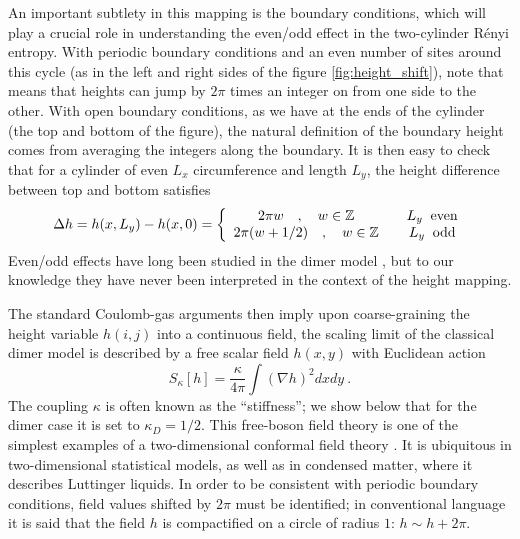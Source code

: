 \documentclass[11pt]{iopart}
\begin{document}
An important subtlety in this mapping is the boundary conditions, which will play a crucial role in understanding the even/odd effect in the two-cylinder R\'enyi entropy.
With periodic boundary conditions and an even number of sites around this cycle (as in the left and right sides of the figure \ref{fig:height_shift}), note that means that heights can jump by $2\pi$ times an integer on from one side to the other. 
With open boundary conditions, as we have at the ends of the cylinder (the top and bottom of the figure), the natural definition of the boundary height comes from averaging the integers along the boundary. 
It is then easy to check that for a cylinder of even $L_x$ circumference and length $L_y$,  the height difference between top and bottom satisfies
\begin{equation}
 \Delta h=h(x,L_y)-h(x,0)=\left\{
 \begin{array}{ccc}
  2\pi w \quad,\quad w\in \mathbb{Z}&&L_y \;\;{\rm even}\\
  2\pi (w+1/2) \quad,\quad w\in \mathbb{Z}&&L_y \;\;{\rm odd}
 \end{array}
 \right.
\end{equation}
Even/odd effects have long been studied in the dimer model \cite{Ferdinand,Dimers_all,Ruelledimers}, but to our knowledge they have never been interpreted in the context of the height mapping. 
 
The standard Coulomb-gas arguments \cite{Nienhuis} then imply upon coarse-graining the height variable $h(i,j)$ into a continuous field, the scaling limit of the classical dimer model is described by a free scalar field $h(x,y)$ with Euclidean action
 \begin{equation}\label{eq:free_field_bis}
  S_\kappa[h]=\frac{\kappa}{4\pi}\int \left(\nabla h\right)^2 dx dy\ .
 \end{equation}
The coupling $\kappa$ is often known as the ``stiffness''; we show below that for the dimer case it is set to $\kappa_D=1/2$. This free-boson field theory is one of the simplest examples of a two-dimensional conformal field theory \cite{Ginsparg}. It is ubiquitous in two-dimensional statistical models, as well as in condensed matter, where it describes Luttinger liquids.  In order to be consistent with periodic boundary conditions, field values shifted by $2\pi$ must be identified; in conventional language it is said that the field $h$ is compactified on a circle of radius $1$: $h\sim h+2\pi$. 
\end{document}
